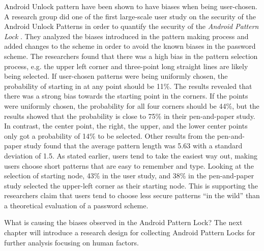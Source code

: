   Android Unlock pattern have been shown to have biases when being user-chosen. A research group did one of the first large-scale user study on the security of the Android Unlock Patterns in order to quantify the security of the {\it Android Pattern Lock} \cite{Uellenbeck}. They analyzed the biases introduced in the pattern making process and added changes to the scheme in order to avoid the known biases in the password scheme. The researchers found that there was a high bias in the pattern selection process, e.g. the upper left corner and three-point long straight lines are likely being selected. If user-chosen patterns were being uniformly chosen, the probability of starting in at any point should be 11\%. The results revealed that there was a strong bias towards the starting point in the corners. If the points were uniformly chosen, the probability for all four corners should be 44\%, but the results showed that the probability is close to 75\% in their pen-and-paper study. In contrast, the center point, the right, the upper, and the lower center points only got a probability of 14\% to be selected. Other results from the pen-and-paper study found that the average pattern length was 5.63 with a standard deviation of 1.5. As stated earlier, users tend to take the easiest way out, making users choose short patterns that are easy to remember and type. Looking at the selection of starting node, 43\% in the user study, and 38\% in the pen-and-paper study selected the upper-left corner as their starting node. This is supporting the researchers claim that users tend to choose less secure patterns ``in the wild'' than a theoretical evaluation of a password scheme.

  What is causing the biases observed in the Android Pattern Lock? The next chapter will introduce a research design for collecting Android Pattern Locks for further analysis focusing on human factors.

  \clearpage

